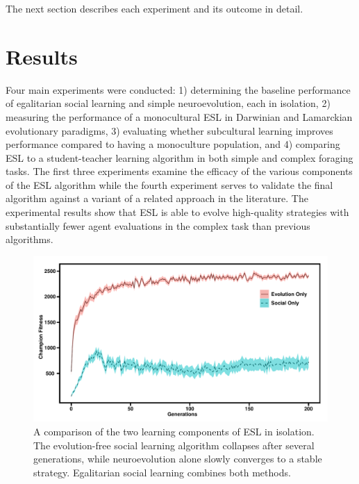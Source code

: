 \documentclass{sig-alternate}
\begin{document}
The next section describes each experiment and its outcome in detail.


\section{Results}
\label{sec:results}
Four main experiments were conducted: 1) determining the baseline performance of egalitarian social learning and simple neuroevolution, each in isolation, 2) measuring the performance of a monocultural ESL in Darwinian and Lamarckian evolutionary paradigms, 3) evaluating whether subcultural learning improves performance compared to having a monoculture population, and 4) comparing ESL to a student-teacher learning algorithm in both simple and complex foraging tasks. The first three experiments examine the efficacy of the various components of the ESL algorithm while the fourth experiment serves to validate the final algorithm against a variant of a related approach in the literature. The experimental results show that ESL is able to evolve high-quality strategies with substantially fewer agent evaluations in the complex task than previous algorithms.


\begin{figure}
  \centering
    \includegraphics[scale=.42]{social_learning_vs_neuroevolution.pdf}
  \caption{A comparison of the two learning components of ESL in isolation.  The evolution-free social learning algorithm collapses after several generations, while neuroevolution alone slowly converges to a stable strategy.  Egalitarian social learning combines both methods.}
  \label{fig:social-neuro}
\end{figure}
\end{document}
